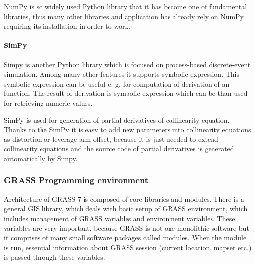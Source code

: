 \documentclass[a4paper,12pt]{article}
\begin{document}
NumPy is so widely used Python library that it has become one of fundamental libraries, thus many
other libraries and application has already rely on NumPy requiring its installation in order to work.

\paragraph{SimPy}

Simpy is another Python library which is focused on process-based discrete-event simulation.
Among many other features it supports symbolic expression. This symbolic expression can be useful
e. g. for computation of derivation of an function. The result of derivation is symbolic expression which can 
be than used for retrieving numeric values. 

SimPy is used for generation of partial derivatives of collinearity equation. Thanks to the SimPy 
it is easy to add new parameters into collinearity equations as distortion or leverage arm offset,
because it is just needed to extend collinearity equations and the source code of partial derivatives 
is generated automatically by Simpy. 

\subsubsection{GRASS Programming  environment}

Architecture of GRASS 7 is composed of core libraries and modules. There is a general GIS library, which 
deals with basic setup of GRASS environment, which includes management of
GRASS variables and environment variables. These variables are very important, because GRASS is not one monolithic software 
but it comprises of many small software packages called modules. When the module is run, essential information 
about GRASS session (current location, mapset etc.) is passed through these variables. 
\end{document}
